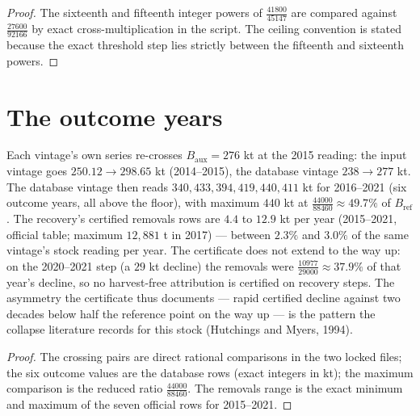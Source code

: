 \begin{proof}
The sixteenth and fifteenth integer powers of
\(\tfrac{41800}{45147}\) are compared against
\(\tfrac{27600}{92166}\) by exact cross-multiplication in the script.
The ceiling convention is stated because the exact threshold step lies
strictly between the fifteenth and sixteenth powers.
\end{proof}

\section{The outcome years}\label{regime-outcome}

\begin{proposition}
\label{regime-prop:recovery}
Each vintage's own series re-crosses \(B_{\mathrm{aux}} = 276\) kt at
the 2015 reading: the input vintage goes \(250.12 \to 298.65\) kt
(2014--2015), the database vintage \(238 \to 277\) kt. The database
vintage then reads \(340, 433, 394, 419, 440, 411\) kt for
2016--2021 (six outcome years, all above the floor), with maximum
\(440\) kt at \(\tfrac{44000}{88460} \approx 49.7\%\) of
\(B_{\mathrm{ref}}\). The recovery's certified removals rows are
\(4.4\) to \(12.9\) kt per year (2015--2021, official table; maximum
\(12{,}881\) t in 2017) --- between \(2.3\%\) and \(3.0\%\) of the
same vintage's stock reading per year. The certificate does not
extend to the way up: on the 2020--2021 step (a \(29\) kt decline)
the removals were \(\tfrac{10977}{29000} \approx 37.9\%\) of that
year's decline, so no harvest-free attribution is certified on
recovery steps. The asymmetry the certificate thus documents --- rapid
certified decline against two decades below half the reference point on
the way up --- is the pattern the collapse literature records for this
stock (Hutchings and Myers, 1994).
\end{proposition}

\begin{proof}
The crossing pairs are direct rational comparisons in the two locked
files; the six outcome values are the database rows (exact integers in
kt); the maximum comparison is the reduced ratio
\(\tfrac{44000}{88460}\). The removals range is the exact minimum and
maximum of the seven official rows for 2015--2021.
\end{proof}

